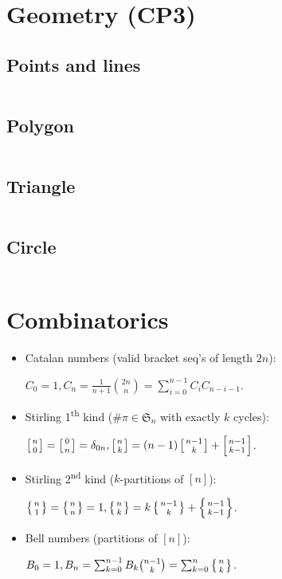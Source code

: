 \documentclass[8pt,a4paper,landscape,oneside]{amsart}
\newcommand{\mintedstyle}[2]{\inputminted[fontsize=\normalsize,baselinestretch=.9,breaklines,tabsize=2]{#1}{code/#2}}
\newcommand{\code}[1]{\mintedstyle{cpp}{#1}}
\begin{document}
\begin{multicols*}{3}
\section{Geometry (CP3)}
\subsection{Points and lines}
\code{geometry/CP/points_lines.cpp}
\subsection{Polygon}
\code{geometry/CP/polygon.cpp}
\subsection{Triangle}
\code{geometry/CP/triangles.cpp}
\subsection{Circle}
\code{geometry/CP/circles.cpp}

\section{Combinatorics}
\begin{itemize}[wide,labelwidth=!,labelindent=0pt]
	\item Catalan numbers (valid bracket seq's of length $2n$):

		$C_0 = 1, C_n = \frac{1}{n+1}\binom{2n}{n} = \sum_{i=0}^{n-1}C_iC_{n-i-1}$.

	\item Stirling 1\textsuperscript{th} kind ($\# \pi \in \mathfrak{S}_n$ with exactly $k$ cycles):

		$\left[{n\atop 0}\right]=\left[{0\atop n}\right] = \delta_{0n}, \left[{n\atop k}\right]=(n-1)\left[{n-1\atop k}\right]+\left[{n-1\atop k-1}\right]$.

	\item Stirling 2\textsuperscript{nd} kind ($k$-partitions of $[n]$):

		$\left\{{n\atop 1}\right\}=\left\{{n\atop n}\right\}=1, \left\{{n\atop k}\right\} = k \left\{{ n-1 \atop k }\right\} + \left\{{n-1\atop k-1}\right\}$.

    \item Bell numbers (partitions of $[n]$):

		$B_0 = 1, B_n = \sum_{k=0}^{n-1} B_k \binom{n-1}{k} = \sum_{k=0}^n\left\{{n\atop k}\right\}$.


\end{itemize}
\end{multicols*}
\end{document}
